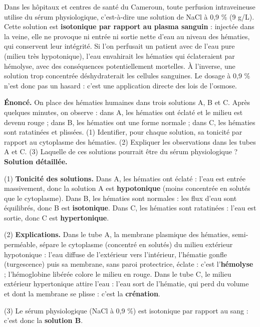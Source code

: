 \documentclass[11pt]{article}
\newcommand{\cle}[1]{{\popxbold\color{popdark}#1}}
\begin{document}
\begin{exemplebox}
Dans les hôpitaux et centres de santé du Cameroun, toute perfusion intraveineuse utilise du \cle{sérum physiologique}, c'est-à-dire une solution de NaCl à 0,9 \% (9 g/L). Cette solution est \textbf{isotonique par rapport au plasma sanguin} : injectée dans la veine, elle ne provoque ni entrée ni sortie nette d'eau au niveau des hématies, qui conservent leur intégrité. Si l'on perfusait un patient avec de l'eau pure (milieu très hypotonique), l'eau envahirait les hématies qui éclateraient par hémolyse, avec des conséquences potentiellement mortelles. À l'inverse, une solution trop concentrée déshydraterait les cellules sanguines. Le dosage à 0,9 \% n'est donc pas un hasard : c'est une application directe des lois de l'osmose.
\end{exemplebox}

\begin{exoresolu}
\textbf{Énoncé.} On place des hématies humaines dans trois solutions A, B et C. Après quelques minutes, on observe : dans A, les hématies ont éclaté et le milieu est devenu rouge ; dans B, les hématies ont une forme normale ; dans C, les hématies sont ratatinées et plissées. (1) Identifier, pour chaque solution, sa tonicité par rapport au cytoplasme des hématies. (2) Expliquer les observations dans les tubes A et C. (3) Laquelle de ces solutions pourrait être du sérum physiologique ?
\tcblower
\textbf{Solution détaillée.}

(1) \textbf{Tonicité des solutions.} Dans A, les hématies ont éclaté : l'eau est entrée massivement, donc la solution A est \textbf{hypotonique} (moins concentrée en solutés que le cytoplasme). Dans B, les hématies sont normales : les flux d'eau sont équilibrés, donc B est \textbf{isotonique}. Dans C, les hématies sont ratatinées : l'eau est sortie, donc C est \textbf{hypertonique}.

(2) \textbf{Explications.} Dans le tube A, la membrane plasmique des hématies, semi-perméable, sépare le cytoplasme (concentré en solutés) du milieu extérieur hypotonique : l'eau diffuse de l'extérieur vers l'intérieur, l'hématie gonfle (turgescence) puis sa membrane, sans paroi protectrice, éclate : c'est l'\textbf{hémolyse} ; l'hémoglobine libérée colore le milieu en rouge. Dans le tube C, le milieu extérieur hypertonique attire l'eau : l'eau sort de l'hématie, qui perd du volume et dont la membrane se plisse : c'est la \textbf{crénation}.

(3) Le sérum physiologique (NaCl à 0,9 \%) est isotonique par rapport au sang : c'est donc la \textbf{solution B}.
\end{exoresolu}
\end{document}
